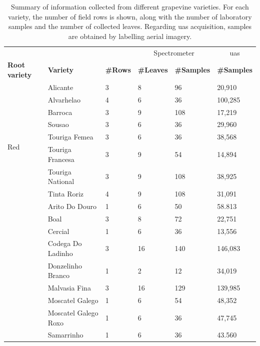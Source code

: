 \newcommand{\varietySpacing}{\hskip 0.25in}
\renewcommand{\arraystretch}{1.1}
\begin{table}[bp]
\centering
\caption{Summary of information collected from different grapevine varieties. For each variety, the number of field rows is shown, along with the number of laboratory samples and the number of collected leaves. Regarding \acrshort{uas} acquisition, samples are obtained by labelling aerial imagery.}
\label{table:grape_samples}
\begin{tabular}{|*6{l@{\varietySpacing}|}}
\cmidrule{4-6}
\multicolumn{2}{c}{} & & \multicolumn{2}{|c|}{Spectrometer} & \multicolumn{1}{c|}{\acrshort{uas}}\\
\cmidrule{1-6}
\textbf{Root variety} & \textbf{Variety} & \textbf{\#Rows} & \textbf{\#Leaves} & \textbf{\#Samples} & \textbf{\#Samples}\\
\cmidrule{1-6}
\multirow{9}{*}{Red} & Alicante & 3 & 8 & 96 & 20,910\\
& Alvarhelao & 4 & 6 & 36 & 100,285\\
& Barroca & 3 & 9 & 108 & 17,219\\
& Sousao & 3 & 6 & 36 & 29,960\\
& Touriga Femea & 3 & 6 & 36 & 38,568\\
& Touriga Francesa & 3 & 9 & 54 & 14,894\\
& Touriga National & 3 & 9 & 108 & 38,925\\
& Tinta Roriz & 4 & 9 & 108 & 31,091\\
\cmidrule{1-6}
\multirow{9}{*}{White} & Arito Do Douro & 1 & 6 & 50 & 58.813\\
& Boal & 3 & 8 & 72 & 22,751\\
& Cercial & 1 & 6 & 36 & 13,556\\
& Codega Do Ladinho & 3 & 16 & 140 & 146,083\\
& Donzelinho Branco & 1 & 2 & 12 & 34,019\\
& Malvasia Fina & 3 & 16 & 129 & 139,985\\
& Moscatel Galego & 1 & 6 & 54 & 48,352\\
& Moscatel Galego Roxo & 1 & 6 & 36 & 47,745\\
& Samarrinho & 1 & 6 & 36 & 43.560\\
\bottomrule
\end{tabular}
\end{table}
\renewcommand{\arraystretch}{1}


